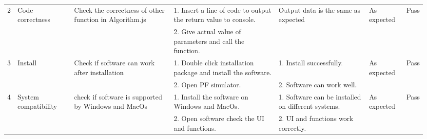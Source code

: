 \documentclass{article}
\begin{document}
\begin{longtable}{|p{10pt}|p{60pt}|p{95pt}|p{130pt}|p{60pt}|p{55pt}|p{25pt}|}
2  & Code correctness     & Check the correctness of other function in Algorithm.js                                                 & 1.    Insert a line of code to output the return value to console.                               & {Output data is the same as expected}                                                   & {As expected}                              & Pass \\ \cline{4-4}
                    &                                       &                                                                                                                           & 2.    Give actual value of parameters and call the function.                                     &                                                                                                        &                                                           &                       \\ \hline
3  & Install              & Check if software can work after installation                                                            & 1.    Double click installation package and install the software.                                & 1.    Install successfully.                                                                            & {As expected}                              & {Pass} \\ \cline{4-5}
                    &                                       &                                                                                                                           & 2.    Open PF simulator.                                                                         & 2.    Software can work well.                                                                          &                                                           &                       \\ \hline
4  & System compatibility & check if software is supported by Windows and MacOs                                                     & 1.    Install the software on Windows and MacOs.                                                 & 1.    Software can be installed on different systems.                                                  & {As expected}                              & {Pass} \\ \cline{4-5}
                    &                                       &                                                                                                                           & 2.    Open software check the UI and functions.                                                  & 2.    UI and functions work correctly.                                                                 &                                                           &                       \\ \hline

\end{longtable}
\end{document}
